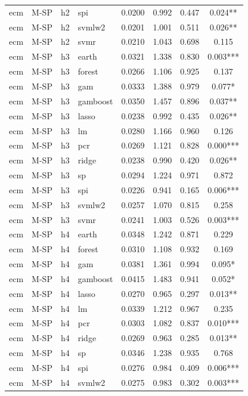 \begin{ThreePartTable}
\begin{longtable}[t]{llclcccc}
ecm & M-SP & h2 & spi & 0.0200 & 0.992 & 0.447 & 0.024**\\
ecm & M-SP & h2 & svmlw2 & 0.0201 & 1.001 & 0.511 & 0.026**\\
ecm & M-SP & h2 & svmr & 0.0210 & 1.043 & 0.698 & 0.115\\
\addlinespace
ecm & M-SP & h3 & earth & 0.0321 & 1.338 & 0.830 & 0.003***\\
ecm & M-SP & h3 & forest & 0.0266 & 1.106 & 0.925 & 0.137\\
ecm & M-SP & h3 & gam & 0.0333 & 1.388 & 0.979 & 0.077*\\
ecm & M-SP & h3 & gamboost & 0.0350 & 1.457 & 0.896 & 0.037**\\
ecm & M-SP & h3 & lasso & 0.0238 & 0.992 & 0.435 & 0.026**\\
ecm & M-SP & h3 & lm & 0.0280 & 1.166 & 0.960 & 0.126\\
ecm & M-SP & h3 & pcr & 0.0269 & 1.121 & 0.828 & 0.000***\\
ecm & M-SP & h3 & ridge & 0.0238 & 0.990 & 0.420 & 0.026**\\
ecm & M-SP & h3 & sp & 0.0294 & 1.224 & 0.971 & 0.872\\
ecm & M-SP & h3 & spi & 0.0226 & 0.941 & 0.165 & 0.006***\\
ecm & M-SP & h3 & svmlw2 & 0.0257 & 1.070 & 0.815 & 0.258\\
ecm & M-SP & h3 & svmr & 0.0241 & 1.003 & 0.526 & 0.003***\\
\addlinespace
ecm & M-SP & h4 & earth & 0.0348 & 1.242 & 0.871 & 0.229\\
ecm & M-SP & h4 & forest & 0.0310 & 1.108 & 0.932 & 0.169\\
ecm & M-SP & h4 & gam & 0.0381 & 1.361 & 0.994 & 0.095*\\
ecm & M-SP & h4 & gamboost & 0.0415 & 1.483 & 0.941 & 0.052*\\
ecm & M-SP & h4 & lasso & 0.0270 & 0.965 & 0.297 & 0.013**\\
ecm & M-SP & h4 & lm & 0.0339 & 1.212 & 0.967 & 0.235\\
ecm & M-SP & h4 & pcr & 0.0303 & 1.082 & 0.837 & 0.010***\\
ecm & M-SP & h4 & ridge & 0.0269 & 0.963 & 0.285 & 0.013**\\
ecm & M-SP & h4 & sp & 0.0346 & 1.238 & 0.935 & 0.768\\
ecm & M-SP & h4 & spi & 0.0276 & 0.984 & 0.409 & 0.006***\\
ecm & M-SP & h4 & svmlw2 & 0.0275 & 0.983 & 0.302 & 0.003***\\

\end{longtable}
\end{ThreePartTable}
